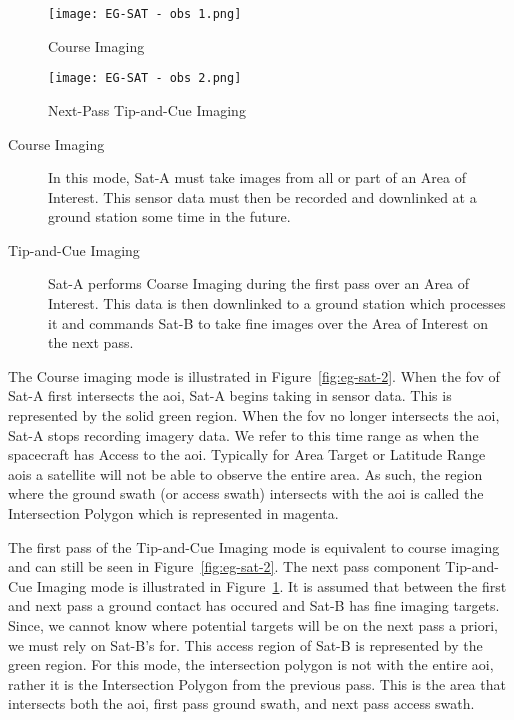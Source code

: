 \begin{figure} 
    \centering
    \begin{minipage}[c]{0.49\textwidth}
	\centering
	\texttt{[image: EG-SAT - obs 1.png]} 
	\caption{Course Imaging}
	\label{fig:eg-sat-2} 
    \end{minipage}
    \hfill
    \begin{minipage}[c]{0.49\textwidth}
	\centering
	\texttt{[image: EG-SAT - obs 2.png]} 
	\caption{Next-Pass Tip-and-Cue Imaging}
	\label{fig:eg-sat-3} 
    \end{minipage} 
\end{figure}

\begin{description} 

    \item[Course Imaging] In this mode, Sat-A must take images from all or part
	of an Area of Interest. This sensor data must then be recorded and
	downlinked at a ground station some time in the future.

    \item[Tip-and-Cue Imaging] Sat-A performs Coarse Imaging during the first
	pass over an Area of Interest. This data is then downlinked to a ground
	station which processes it and commands Sat-B to take fine images over
	the Area of Interest on the next pass.

\end{description}

The Course imaging mode is illustrated in Figure~\ref{fig:eg-sat-2}. When the
\gls{fov} of Sat-A first intersects the \gls{aoi}, Sat-A begins taking in
sensor data. This is represented by the solid green region.  When the \gls{fov}
no longer intersects the \gls{aoi}, Sat-A stops recording imagery data. We
refer to this time range as when the spacecraft has Access to the \gls{aoi}.
Typically for Area Target or Latitude Range \glspl{aoi} a satellite will not be
able to observe the entire area. As such, the region where the ground swath (or
access swath) intersects with the \gls{aoi} is called the Intersection Polygon
which is represented in magenta. 

The first pass of the Tip-and-Cue Imaging mode is equivalent to course imaging
and can still be seen in Figure~\ref{fig:eg-sat-2}. The next pass component
Tip-and-Cue Imaging mode is illustrated in Figure~\ref{fig:eg-sat-3}. It is
assumed that between the first and next pass a ground contact has occured and
Sat-B has fine imaging targets. Since, we cannot know where potential targets
will be on the next pass a priori, we must rely on Sat-B's \gls{for}. This
access region of Sat-B is represented by the green region. For this mode, the
intersection polygon is not with the entire \gls{aoi}, rather it is the
Intersection Polygon from the previous pass. This is the area that intersects
both the \gls{aoi}, first pass ground swath, and next pass access swath.  


